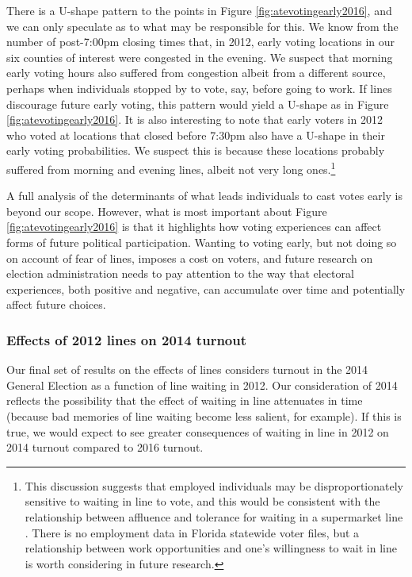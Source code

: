 \documentclass[12pt,titlepage]{article}
\begin{document}
There is a U-shape pattern to the points in Figure
\ref{fig:atevotingearly2016}, and we can only speculate as to what may
be responsible for this.  We know from the number of post-7:00pm
closing times that, in 2012, early voting locations in our six
counties of interest were congested in the evening.  We suspect that
morning early voting hours also suffered from congestion albeit from a
different source, perhaps when individuals stopped by to vote, say,
before going to work.  If lines discourage future early voting, this
pattern would yield a U-shape as in Figure
\ref{fig:atevotingearly2016}.  It is also interesting to note that
early voters in 2012 who voted at locations that closed before 7:30pm
also have a U-shape in their early voting probabilities.  We suspect
this is because these locations probably suffered from morning and
evening lines, albeit not very long ones.\footnote{This discussion
  suggests that employed individuals may be disproportionately
  sensitive to waiting in line to vote, and this would be consistent
  with the relationship between affluence and tolerance for waiting in
  a supermarket line \citep[e.g.,][]{bennett:waitinginlinechars}.
  There is no employment data in Florida statewide voter files, but a
  relationship between work opportunities and one's willingness to
  wait in line is worth considering in future research.}

A full analysis of the determinants of what leads individuals to cast
votes early is beyond our scope.  However, what is most important
about Figure \ref{fig:atevotingearly2016} is that it highlights how
voting experiences can affect forms of future political participation.
Wanting to voting early, but not doing so on account of fear of lines,
imposes a cost on voters, and future research on election
administration needs to pay attention to the way that electoral
experiences, both positive and negative, can accumulate over time and
potentially affect future choices.

\subsubsection*{Effects of 2012 lines on 2014 turnout}

Our final set of results on the effects of lines considers turnout in
the 2014 General Election as a function of line waiting in 2012.  Our
consideration of 2014 reflects the possibility that the effect of
waiting in line attenuates in time (because bad memories of line
waiting become less salient, for example).  If this is true, we would
expect to see greater consequences of waiting in line in 2012 on 2014
turnout compared to 2016 turnout. 
\end{document}
